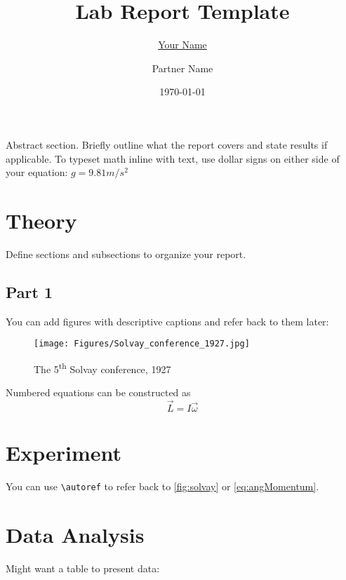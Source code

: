 \documentclass[11pt,oneside,letterpaper]{article} %
\title{Lab Report Template}
\author{\underline{Your Name} \and Partner Name}
\date{\today}
\begin{document}
\maketitle


\abstract %
Abstract section. Briefly outline what the report covers and state results if applicable.
To typeset math inline with text, use dollar signs on either side of your equation: $g = 9.81m/s^2$



\section{Theory}
Define sections and subsections to organize your report.


\subsection{Part 1}
You can add figures with descriptive captions and refer back to them later:
\newline %


\begin{figure}[H] %
   \centering
   \texttt{[image: Figures/Solvay\_conference\_1927.jpg]} %
   \caption{The 5\textsuperscript{th} Solvay conference, 1927}
   \label{fig:solvay} %
\end{figure}


\par Numbered equations can be constructed as %
\begin{equation}
	\vec{L} = I \vec{\omega} \label{eq:angMomentum} %
\end{equation}


\section{Experiment}
You can use \verb|\autoref| to refer back to \autoref{fig:solvay} or \autoref{eq:angMomentum}.



\section{Data Analysis}
Might want a table to present data:
\end{document}
